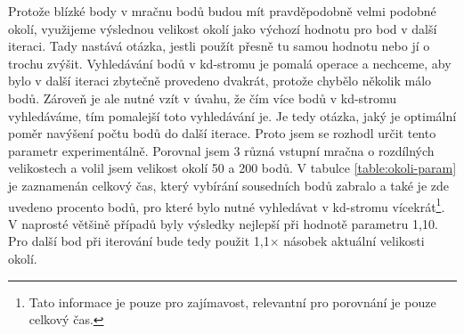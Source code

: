\documentclass[11pt,twoside,a4paper]{book}
\begin{document}
Protože blízké body v mračnu bodů budou mít pravděpodobně velmi podobné okolí, využijeme výslednou velikost okolí jako výchozí hodnotu pro bod v další iteraci. Tady nastává otázka, jestli použít přesně tu samou hodnotu nebo jí o trochu zvýšit. Vyhledávání bodů v kd-stromu je pomalá operace a nechceme, aby bylo v další iteraci zbytečně provedeno dvakrát, protože chybělo několik málo bodů. Zároveň je ale nutné vzít v úvahu, že čím více bodů v kd-stromu vyhledáváme, tím pomalejší toto vyhledávání je. Je tedy otázka, jaký je optimální poměr navýšení počtu bodů do další iterace. Proto jsem se rozhodl určit tento parametr experimentálně. Porovnal jsem 3 různá vstupní mračna o rozdílných velikostech a volil jsem velikost okolí 50 a 200 bodů. V tabulce \ref{table:okoli-param} je zaznamenán celkový čas, který vybírání sousedních bodů zabralo a také je zde uvedeno procento bodů, pro které bylo nutné vyhledávat v kd-stromu vícekrát\footnote{Tato informace je pouze pro zajímavost, relevantní pro porovnání je pouze celkový čas.}. V naprosté většině případů byly výsledky nejlepší při hodnotě parametru 1,10. Pro další bod při iterování bude tedy použit 1,1$\times$ násobek aktuální velikosti okolí.
\end{document}

